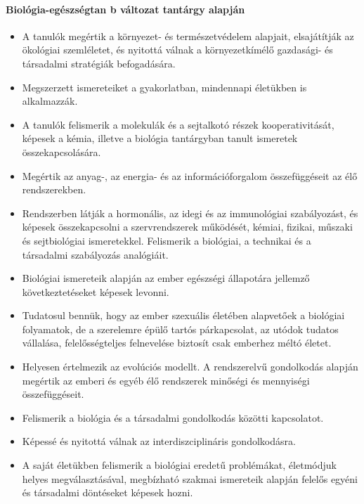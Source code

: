 \paragraph{Biológia-egészségtan
b változat tantárgy alapján}
\begin{itemize}
\item A tanulók megértik a környezet- és természetvédelem alapjait, elsajátítják az ökológiai szemléletet, és nyitottá válnak a környezetkímélő gazdasági- és társadalmi stratégiák befogadására.
\item Megszerzett ismereteiket a gyakorlatban, mindennapi életükben is alkalmazzák.
\item A tanulók felismerik a molekulák és a sejtalkotó részek kooperativitását, képesek a kémia, illetve a biológia tantárgyban tanult ismeretek összekapcsolására.
\item Megértik az anyag-, az energia- és az információforgalom összefüggéseit az élő rendszerekben.
\item Rendszerben látják a hormonális, az idegi és az immunológiai szabályozást, és képesek összekapcsolni a szervrendszerek működését, kémiai, fizikai, műszaki és sejtbiológiai ismeretekkel. Felismerik a biológiai, a technikai és a társadalmi szabályozás analógiáit.
\item Biológiai ismereteik alapján az ember egészségi állapotára jellemző következtetéseket képesek levonni.
\item Tudatosul bennük, hogy az ember szexuális életében alapvetőek a biológiai folyamatok, de a szerelemre épülő tartós párkapcsolat, az utódok tudatos vállalása, felelősségteljes felnevelése biztosít csak emberhez méltó életet.
\item Helyesen értelmezik az evolúciós modellt. A rendszerelvű gondolkodás alapján megértik az emberi és egyéb élő rendszerek minőségi és mennyiségi összefüggéseit.
\item Felismerik a biológia és a társadalmi gondolkodás közötti kapcsolatot.
\item Képessé és nyitottá válnak az interdiszciplináris gondolkodásra.
\item A saját életükben felismerik a biológiai eredetű problémákat, életmódjuk helyes megválasztásával, megbízható szakmai ismereteik alapján felelős egyéni és társadalmi döntéseket képesek hozni.
\end{itemize}
